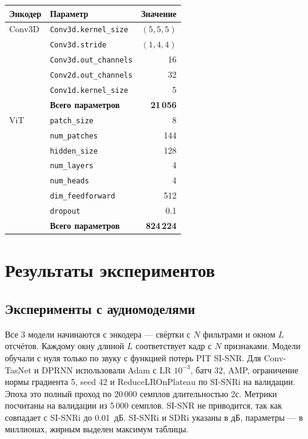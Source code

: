 \documentclass[10pt,conference,compsocconf]{IEEEtran}
\begin{document}
\begin{experimenttable}
    \caption{Гиперпараметры видеоэнкодеров}
    \label{tab:visual_encoders}
    \begin{tabularx}{\linewidth}{@{}lXr@{}}
        \toprule
        Энкодер & Параметр & Значение \\
        \midrule
        Conv3D & \texttt{Conv3d.kernel\_size} & $(5,5,5)$ \\
               & \texttt{Conv3d.stride} & $(1,4,4)$ \\
               & \texttt{Conv3d.out\_channels} & 16 \\
               & \texttt{Conv2d.out\_channels} & 32 \\
               & \texttt{Conv1d.kernel\_size} & 5 \\
               & \textbf{Всего параметров} & \textbf{21\,056} \\
        \midrule
        ViT    & \texttt{patch\_size} & 8 \\
               & \texttt{num\_patches} & 144 \\
               & \texttt{hidden\_size} & 128 \\
               & \texttt{num\_layers} & 4 \\
               & \texttt{num\_heads} & 4 \\
               & \texttt{dim\_feedforward} & 512 \\
               & \texttt{dropout} & 0.1 \\
               & \textbf{Всего параметров} & \textbf{824\,224} \\
        \bottomrule
    \end{tabularx}
\end{experimenttable}

\section{Результаты экспериментов}\label{sec:results}

\subsection{Эксперименты с аудиомоделями}\label{sec:audio_experiments}

Все 3 модели начинаются с энкодера --- свёртки с $N$ фильтрами и окном $L$ отсчётов. Каждому окну длиной $L$ соответствует кадр с $N$ признаками. Модели обучали с нуля только по звуку с функцией потерь PIT SI-SNR. Для Conv-TasNet и DPRNN использовали Adam с LR $10^{-3}$, батч 32, AMP, ограничение нормы градиента 5, seed 42 и ReduceLROnPlateau по SI-SNRi на валидации. Эпоха это полный проход по 20\,000 семплов длительностью 2с. Метрики посчитаны на валидации из 5\,000 семплов. SI-SNR не приводится, так как совпадает с SI-SNRi до 0.01~дБ. SI-SNRi и SDRi указаны в дБ, параметры --- в миллионах, жирным выделен максимум таблицы.
\end{document}
